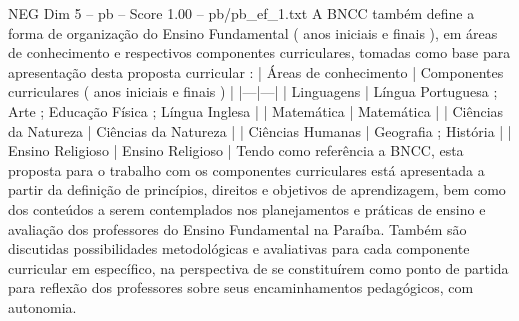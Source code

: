 \begin{textsample}{NEG Dim 5 – pb – Score 1.00 – pb/pb\_ef\_1.txt}
A BNCC também define a forma de organização do Ensino Fundamental ( anos iniciais e finais ), em áreas de conhecimento e respectivos componentes curriculares, tomadas como base para apresentação desta proposta curricular : | Áreas de conhecimento | Componentes curriculares ( anos iniciais e finais ) | |---|---| | Linguagens | Língua Portuguesa ; Arte ; Educação Física ; Língua Inglesa | | Matemática | Matemática | | Ciências da Natureza | Ciências da Natureza | | Ciências Humanas | Geografia ; História | | Ensino Religioso | Ensino Religioso | Tendo como referência a BNCC, esta proposta para o trabalho com os componentes curriculares está apresentada a partir da definição de princípios, direitos e objetivos de aprendizagem, bem como dos conteúdos a serem contemplados nos planejamentos e práticas de ensino e avaliação dos professores do Ensino Fundamental na Paraíba.
Também são discutidas possibilidades metodológicas e avaliativas para cada componente curricular em específico, na perspectiva de se constituírem como ponto de partida para reflexão dos professores sobre seus encaminhamentos pedagógicos, com autonomia.

\end{textsample}
